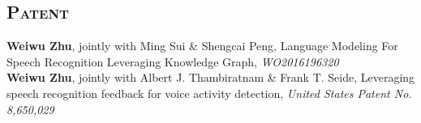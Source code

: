 \begin{resume}





\section{\textsc{Patent}}
\textbf{Weiwu Zhu}, jointly with Ming Sui \& Shengcai Peng, Language Modeling For Speech Recognition Leveraging Knowledge Graph, {\it WO2016196320}\\
\vspace*{-4pt}
\newline
\textbf{Weiwu Zhu}, jointly with Albert J. Thambiratnam \& Frank T. Seide, Leveraging speech recognition feedback for voice activity detection, {\it United States Patent No. 8,650,029}\\


\end{resume}
